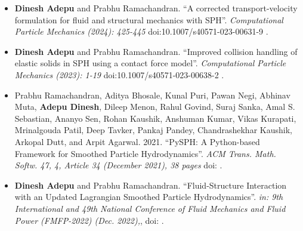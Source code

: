%
%



\begin{itemize}
\item \textbf{Dinesh Adepu} and Prabhu Ramachandran. ``A corrected transport-velocity
  formulation for fluid and structural mechanics with SPH''.
  \emph{Computational Particle Mechanics (2024): 425-445} doi:10.1007/s40571-023-00631-9 .


\item \textbf{Dinesh Adepu} and Prabhu Ramachandran. ``Improved collision
  handling of elastic solids in SPH using a contact force model''.
  \emph{Computational Particle Mechanics (2023): 1-19} doi:10.1007/s40571-023-00638-2 .


\item Prabhu Ramachandran, Aditya Bhosale, Kunal Puri, Pawan Negi, Abhinav Muta,
  \textbf{Adepu Dinesh}, Dileep Menon, Rahul Govind, Suraj Sanka, Amal S.
  Sebastian, Ananyo Sen, Rohan Kaushik, Anshuman Kumar, Vikas Kurapati,
  Mrinalgouda Patil, Deep Tavker, Pankaj Pandey, Chandrashekhar Kaushik, Arkopal
  Dutt, and Arpit Agarwal. 2021. ``PySPH: A Python-based Framework for Smoothed
  Particle Hydrodynamics''. \emph{ACM Trans. Math. Softw. 47, 4, Article 34 (December
  2021), 38 pages} doi: .
\end{itemize}



\begin{itemize}
\item \textbf{Dinesh Adepu} and Prabhu Ramachandran. ``Fluid-Structure
  Interaction with an Updated Lagrangian Smoothed Particle Hydrodynamics''.
  \emph{in: 9th International and 49th National Conference of Fluid Mechanics and Fluid Power (FMFP-2022) (Dec. 2022),}, doi: .
\end{itemize}
